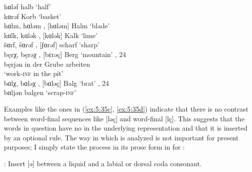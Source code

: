 \ea\label{ex:5:35}
\ea\label{ex:5:35a}  hɑləf        \tab [hɑlǝf]         \tab halb                  \tab ‘half’         \\
     kɑrəf        \tab [kɑrǝf]         \tab Korb                  \tab ‘basket’       \\
\ex\label{ex:5:35b}  hɑlm, hɑlǝm  \tab [hɑlm], [hɑlǝm] \tab Halm                  \tab ‘blade’        \\
     kɑlk, kɑlǝk  \tab [kɑlk], [kɑlǝk] \tab Kalk                  \tab ‘lime’         \\
     šɑrf, šɑrəf  \tab [ʃɑrf], [ʃɑrǝf] \tab scharf                \tab ‘sharp’        \\
\ex\label{ex:5:35c}  bęrχ, bęrəχ  \tab [bɛrç], [bɛrǝç] \tab Berg                  \tab ‘mountain’ , 24\\
     bęrjən       \tab [bɛrʝǝn]        \tab in der Grube arbeiten \\
                  \tab                 \tab ‘work-\textsc{inf} in the pit’     \\
\ex\label{ex:5:35d}  bɑlχ, bɑləχ  \tab [bɑlç], [bɑlǝç] \tab Balg                  \tab ‘brat’                         , 24\\
     bɑljən       \tab [bɑlʝǝn]        \tab balgen                \tab ‘scrap-\textsc{inf}’               \\
\z 
\z 

Examples like the ones in (\ref{ex:5:35c}, \ref{ex:5:35d}) indicate that there is no contrast between word-final sequences like [lǝç] and word-final [lç]. This suggests that the words in question have no  in the underlying representation and that it is inserted by an optional rule. The way in which  is analyzed is not important for present purposes; I simply state the process in its prose form in  for :\largerpage[1.5]

\ea%
\label{ex:5:36}
  : Insert [ǝ] between a liquid and a labial or dorsal coda consonant.
\z 

